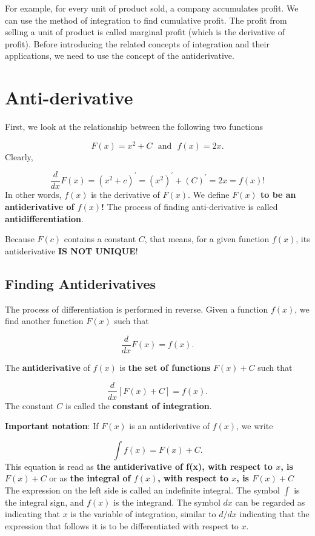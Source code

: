 \documentclass[
]{book}
\begin{document}
For example, for every unit of product sold, a company accumulates profit. We can use the method of integration to find cumulative profit. The profit from selling a unit of product is called marginal profit (which is the derivative of profit). Before introducing the related concepts of integration and their applications, we need to use the concept of the antiderivative.

\hfill\break

\hypertarget{anti-derivative}{%
\section{Anti-derivative}\label{anti-derivative}}

First, we look at the relationship between the following two functions

\[
F(x) = x^2 + C ~~~\text{and}~~~ f(x) = 2x.
\]
Clearly,

\[
\frac{d}{dx}F(x) = (x^2+c)^\prime = (x^2)^\prime + (C)^\prime = 2x = f(x)!
\]
In other words, \(f(x)\) is the derivative of \(F(x)\). We define \textbf{\color{red}\Large \(F(x)\) to be an antiderivative of \(f(x)\)!} The process of finding anti-derivative is called \textbf{antidifferentiation}.

Because \(F(c)\) contains a constant \(C\), that means, for a given function \(f(x)\), its antiderivative \textbf{IS NOT UNIQUE}!

\hfill\break

\hypertarget{finding-antiderivatives}{%
\subsection{Finding Antiderivatives}\label{finding-antiderivatives}}

The process of differentiation is performed in reverse. Given a function \(f(x)\), we find another function \(F(x)\) such that

\[
\frac{d}{dx}F(x) = f(x).
\]

The \textbf{antiderivative} of \(f(x)\) is \textbf{\color{red}the set of functions} \(F(x) + C\) such that

\[
\frac{d}{dx}\left[ F(x) + C\right] = f(x).
\]
The constant \(C\) is called the \textbf{constant of integration}.

\textbf{Important notation}: If \(F(x)\) is an antiderivative of \(f(x)\), we write

\[
\int f(x) = F(x) + C.
\]
This equation is read as \textbf{the antiderivative of f(x), with respect to \(x\), is \(F(x) + C\)} or as \textbf{the integral of \(f(x)\), with respect to \(x\), is \(F(x) + C\)} The expression on the left side is called an indefinite integral. The symbol \textbf{\(\int\)} is the integral sign, and \(f(x)\) is the integrand. The symbol \(dx\) can be regarded as indicating that \(x\) is the variable of integration, similar to \(d/dx\) indicating that the expression that follows it is to be differentiated with respect to \(x\).
\end{document}
